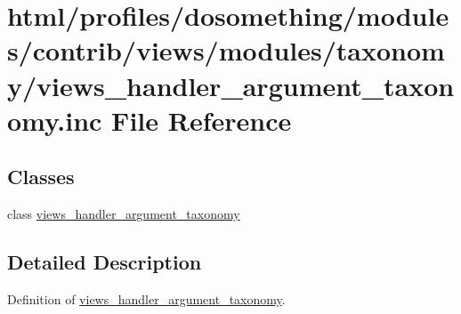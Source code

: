 \hypertarget{views__handler__argument__taxonomy_8inc}{
\section{html/profiles/dosomething/modules/contrib/views/modules/taxonomy/views\_\-handler\_\-argument\_\-taxonomy.inc File Reference}
\label{views__handler__argument__taxonomy_8inc}
}
\subsection*{Classes}
\begin{DoxyCompactItemize}
\item 
class \hyperlink{classviews__handler__argument__taxonomy}{views\_\-handler\_\-argument\_\-taxonomy}
\end{DoxyCompactItemize}


\subsection{Detailed Description}
Definition of \hyperlink{classviews__handler__argument__taxonomy}{views\_\-handler\_\-argument\_\-taxonomy}. 